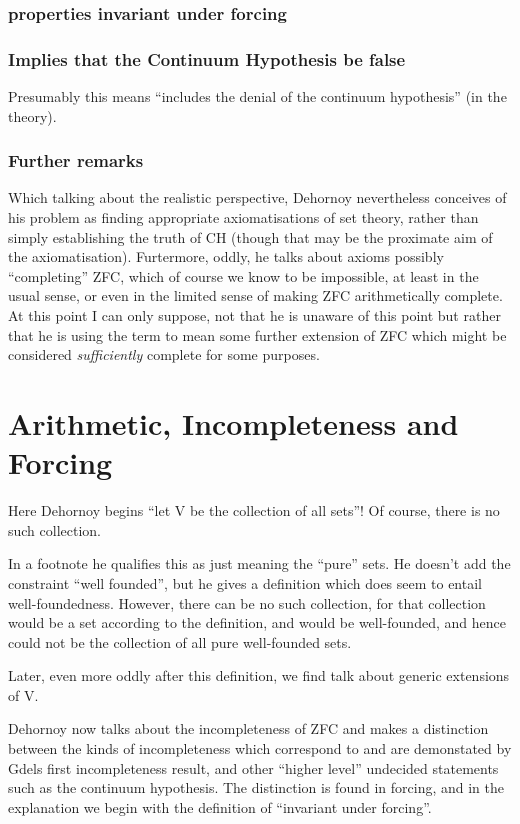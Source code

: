 \subsubsection{properties invariant under forcing}


\subsubsection{Implies that the Continuum Hypothesis be false}

Presumably this means ``includes the denial of the continuum hypothesis'' (in the theory).

\subsubsection{Further remarks}

Which talking about the realistic perspective, Dehornoy nevertheless conceives of his problem as finding appropriate axiomatisations of set theory, rather than simply establishing the truth of CH (though that may be the proximate aim of the axiomatisation).
Furtermore, oddly, he talks about axioms possibly ``completing'' ZFC, which of course we know to be impossible, at least in the usual sense, or even in the limited sense of making ZFC arithmetically complete.
At this point I can only suppose, not that he is unaware of this point but rather that he is using the term to mean some further extension of ZFC which might be considered \emph{sufficiently} complete for some purposes.

\section{Arithmetic, Incompleteness and Forcing}

Here Dehornoy begins ``let V be the collection of all sets''!
Of course, there is no such collection.

In a footnote he qualifies this as just meaning the ``pure'' sets.
He doesn't add the constraint ``well founded'', but he gives a definition which does seem to entail well-foundedness.
However, there can be no such collection, for that collection would be a set according to the definition, and would be well-founded, and hence could not be the collection of all pure well-founded sets.

Later, even more oddly after this definition, we find talk about generic extensions of V.

Dehornoy now talks about the incompleteness of ZFC and makes a distinction between the kinds of incompleteness which correspond to and are demonstated by G{\ouml}dels first incompleteness result, and other ``higher level'' undecided statements such as the continuum hypothesis.
The distinction is found in forcing, and in the explanation we begin with the definition of ``invariant under forcing''.

